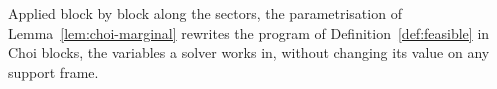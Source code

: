 
Applied block by block along the sectors, the parametrisation of
Lemma~\ref{lem:choi-marginal} rewrites the program of
Definition~\ref{def:feasible} in Choi blocks, the variables a solver works
in, without changing its value on any support frame.

